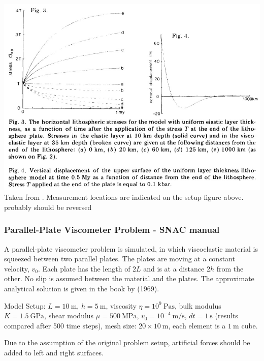 \begin{center}
\includegraphics[width=16cm]{images/viscoelasticity/kubo77}\\
{\captionfont Taken from \textcite{kubo77}. Measurement locations are indicated on 
the setup figure above. probably should be reversed}
\end{center}






\subsubsection{Parallel-Plate Viscometer Problem - SNAC manual \label{v-e-snac}}

A parallel-plate viscometer problem is simulated, in which viscoelastic material is squeezed between two
parallel plates. The plates are moving at a constant velocity, $v_0$. Each plate has the length of $2L$ and 
is at a distance $2h$ from the other. No slip is assumed between the material and the plates. The approximate
analytical solution is given in the book by \textcite{jaeg69} (1969).

Model Setup: $L = 10~\si{\meter}$, $h=5~\si{\meter}$, viscosity $\eta=10^9~\si{\pascal\second}$, 
bulk modulus $K= 1.5~\si{\giga\pascal}$, shear modulus $\mu = 500~\si{\mega\pascal}$,
$v_0 = 10^{-4}~\si{\meter\per\second}$, $dt = 1~\si{\second}$ (results compared after 500 time steps),
mesh size: $20\times 10~\si{\meter}$, each element is a $1~\si{\meter}$ cube.

Due to the assumption of the original problem setup, artificial forces should be added to left and right
surfaces.

